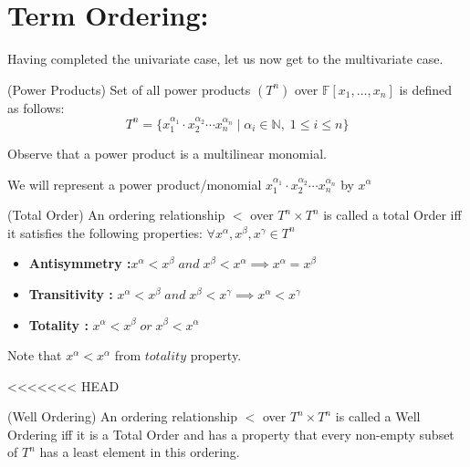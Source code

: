 \section*{Term Ordering:}


Having completed the univariate case, let us now get to the multivariate case.


\begin{definition}(Power Products)
Set of all power products $(T^n)$ over $\mathbb{F}[x_1,\dots,x_n]$ is defined as follows:
$$T^n=\{x_1^{\alpha_{1}}\cdot x_2^{\alpha_{2}}\cdots x_{n}^{\alpha_{n}}\;|\; \alpha_{i}\in \mathbb{N},\;1\leq i\leq n\}$$
\end{definition}
Observe that a power product is a multilinear monomial.

We will represent a power product/monomial $x_1^{\alpha_{1}}\cdot x_2^{\alpha_{2}}\cdots x_{n}^{\alpha_{n}}$ by $x^{\alpha}$ 


\begin{definition}(Total Order)
An ordering relationship $<$ over $T^n \times T^n$ is called a total Order iff it satisfies the following properties:
$ \forall x^{\alpha},x^{\beta},x^{\gamma} \in T^n$
\begin{itemize}
\item \textbf{Antisymmetry :}$ x^{\alpha} < x^{\beta}\; and \;x^{\beta} < x^{\alpha} \implies x^{\alpha} = x^{\beta}$
\item \textbf{Transitivity : }$ x^{\alpha} < x^{\beta} \;and\; x^{\beta} < x^{\gamma} \implies x^{\alpha} < x^{\gamma} $
\item \textbf{ Totality :} $x^{\alpha} < x^{\beta} \;or\; x^{\beta} < x^{\alpha}$
\end{itemize}

Note that $x^{\alpha} < x^{\alpha}$ from $totality$ property.
\end{definition}

<<<<<<< HEAD
\begin{definition}(Well Ordering)
An ordering relationship $<$ over $T^n\times T^n$ is called a Well Ordering iff it is a Total Order and has a property that every non-empty subset of $T^n$ has a least element in this ordering.
\end{definition}

